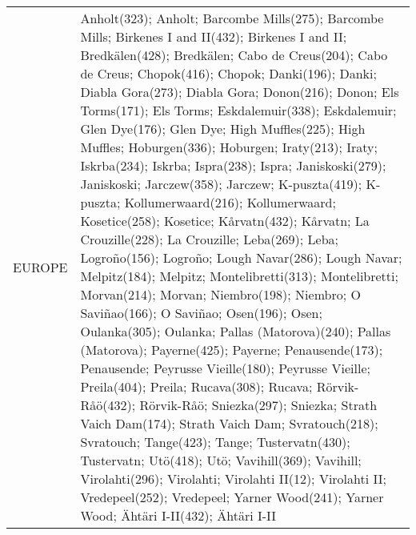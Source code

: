 \documentclass[journal abbreviation, manuscript]{copernicus}
\begin{document}
\begin{table}
\begin{tabularx}{\textwidth}{lX}
  \middlehline
  EUROPE   & Anholt(323); Anholt; Barcombe Mills(275); Barcombe Mills; Birkenes I and II(432); Birkenes I and II; Bredkälen(428); Bredkälen; Cabo de Creus(204); Cabo de Creus; Chopok(416); Chopok; Danki(196); Danki; Diabla Gora(273); Diabla Gora; Donon(216); Donon; Els Torms(171); Els Torms; Eskdalemuir(338); Eskdalemuir; Glen Dye(176); Glen Dye; High Muffles(225); High Muffles; Hoburgen(336); Hoburgen; Iraty(213); Iraty; Iskrba(234); Iskrba; Ispra(238); Ispra; Janiskoski(279); Janiskoski; Jarczew(358); Jarczew; K-puszta(419); K-puszta; Kollumerwaard(216); Kollumerwaard; Kosetice(258); Kosetice; Kårvatn(432); Kårvatn; La Crouzille(228); La Crouzille; Leba(269); Leba; Logroño(156); Logroño; Lough Navar(286); Lough Navar; Melpitz(184); Melpitz; Montelibretti(313); Montelibretti; Morvan(214); Morvan; Niembro(198); Niembro; O Saviñao(166); O Saviñao; Osen(196); Osen; Oulanka(305); Oulanka; Pallas (Matorova)(240); Pallas (Matorova); Payerne(425); Payerne; Penausende(173); Penausende; Peyrusse Vieille(180); Peyrusse Vieille; Preila(404); Preila; Rucava(308); Rucava; Rörvik-Råö(432); Rörvik-Råö; Sniezka(297); Sniezka; Strath Vaich Dam(174); Strath Vaich Dam; Svratouch(218); Svratouch; Tange(423); Tange; Tustervatn(430); Tustervatn; Utö(418); Utö; Vavihill(369); Vavihill; Virolahti(296); Virolahti; Virolahti II(12); Virolahti II; Vredepeel(252); Vredepeel; Yarner Wood(241); Yarner Wood; Ähtäri I-II(432); Ähtäri I-II                                                                                                                                                                                                                                                                                                                                                                                                                                                                                                                                                                                                                                                                                                                                                                                                                                                                                                                                                                                                                                                                                                                                                                                                                                                                                                                                                                                                                                                                                                                                                                                                                                                                                                                                                                                                                                                                                                                   
\end{tabularx}
\end{table}
\end{document}
